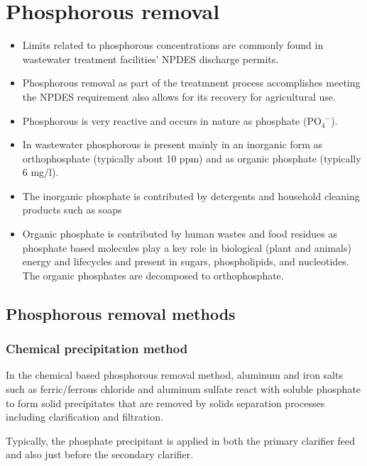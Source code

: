 \section{Phosphorous removal}
		\begin{itemize}
		\item Limits related to phosphorous concentrations are commonly found in wastewater treatment facilities' NPDES discharge permits.
		\item Phosphorous removal as part of the treatmnent process accomplishes meeting the NPDES requirement also allows for its recovery for agricultural use.
			\item Phosphorous is very reactive and occurs in nature as phosphate (PO$_4^{\enspace -}$).  
			\item In wastewater phosphorous is present mainly in an inorganic form as orthophosphate (typically about 10 ppm) and as organic phosphate (typically 6 mg/l).
			\item The inorganic phosphate is contributed by detergents and household cleaning products such as soaps
			\item Organic phosphate is contributed by human wastes and food residues as phosphate based molecules play a key role in biological (plant and animals) energy and lifecycles and present in sugars, phospholipids, and nucleotides.  The organic phosphates are decomposed to orthophosphate.
		\end{itemize}
	\vspace{0.3cm}
\subsection{Phosphorous removal methods}

\subsubsection{Chemical precipitation method}

			In the chemical based phosphorous removal method, aluminum and iron salts such as ferric/ferrous chloride and aluminum sulfate react with soluble phosphate to form solid precipitates that are removed by solids separation processes including clarification and filtration. 
			
			Typically, the phosphate precipitant is applied in both the primary clarifier feed and also just before the secondary clarifier.


